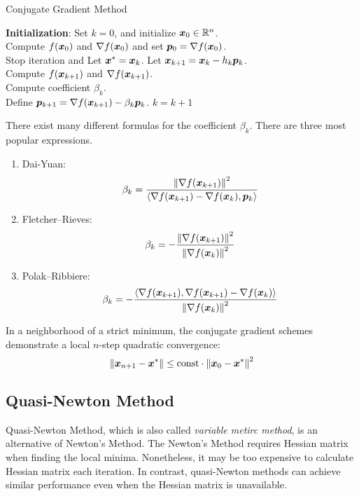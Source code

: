 \begin{algorithm}[!htbp]
    \caption{Conjugate Gradient Method}\label{alg:conjugate-grad}
    \textbf{Initialization}: Set \(k = 0\), and initialize \(\bm{x}_0 \in \mathbb{R}^n\). \\
    Compute \(f(\bm{x}_0)\) and \(\nabla f(\bm{x}_0)\) and set \(\bm{p}_0 = \nabla f(\bm{x}_0)\).\\
     {
         {
            Stop iteration and Let \(\bm{x}^* = \bm{x}_k\).
        }{
            Let \(\bm{x}_{k+1} = \bm{x}_k - h_k \bm{p}_k\). \\
            Compute \(f(\bm{x}_{k+1})\) and \(\nabla f(\bm{x}_{k+1})\). \\
            Compute coefficient \(\beta_k\). \\
            Define \(\bm{p}_{k+1} = \nabla f(\bm{x}_{k+1}) - \beta_k \bm{p}_k\).
        }
        \(k = k+1\)
    }
\end{algorithm}

There exist many different formulas for the coefficient \(\beta_k\). There are three most popular
expressions.
\begin{enumerate}
    \item {
        Dai-Yuan:
        \[
            \beta_k = \frac{\norm{\nabla f(\bm{x}_{k+1})}^2}
            {\left\langle \nabla f(\bm{x}_{k+1}) - \nabla f(\bm{x}_{k}),\bm{p}_k \right\rangle}  
        \]
    }
    \item {
        Fletcher–Rieves: 
        \[
            \beta_k = -\frac{\norm{\nabla f(\bm{x}_{k+1})}^2}{\norm{\nabla f(\bm{x}_{k})}^2}  
        \]
    }
    \item {
        Polak–Ribbiere:
        \[
            \beta_k = -\frac{\left\langle \nabla f(\bm{x}_{k+1}),\nabla f(\bm{x}_{k+1}) - \nabla f(\bm{x}_{k}) \right\rangle}{\norm{\nabla f(\bm{x}_{k})}^2}  
        \]
    }
\end{enumerate}

In a neighborhood of a strict minimum, the conjugate gradient schemes demonstrate a local \(n\)-step quadratic convergence:
\[
    \norm{\bm{x}_{n+1} - \bm{x}^*} \le \text{const} \cdot \norm{\bm{x}_0 - \bm{x}^*}^2  
\]

\subsection{Quasi-Newton Method}

Quasi-Newton Method, which is also called \emph{variable metirc method}, is an alternative of Newton's Method.
The Newton's Method requires Hessian matrix when finding the local minima. Nonetheless, it may be too expensive
to calculate Hessian matrix each iteration. In contrast, quasi-Newton methods can achieve similar performance
even when the Hessian matrix is unavailable.

